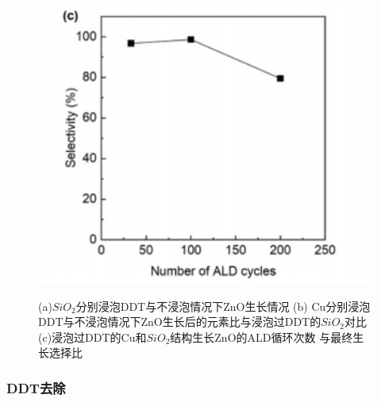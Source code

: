 \documentclass[UTF8,a4paper,12pt]{ctexart}%
\begin{document}
\begin{figure}[htb]
	\begin{minipage}[t]{0.3\textwidth}
	\centering
	\includegraphics[width=1\textwidth]{12.jpg}
	\label{Fig:12}
	\end{minipage}
	\caption{(a)$SiO_2$分别浸泡DDT与不浸泡情况下ZnO生长情况 (b)
	Cu分别浸泡DDT与不浸泡情况下ZnO生长后的元素比与浸泡过DDT的$SiO_2$对比 (c)浸泡过DDT的Cu和$SiO_2$结构生长ZnO的ALD循环次数
	与最终生长选择比}
\end{figure}



\subsubsection{DDT去除}
\end{document}

